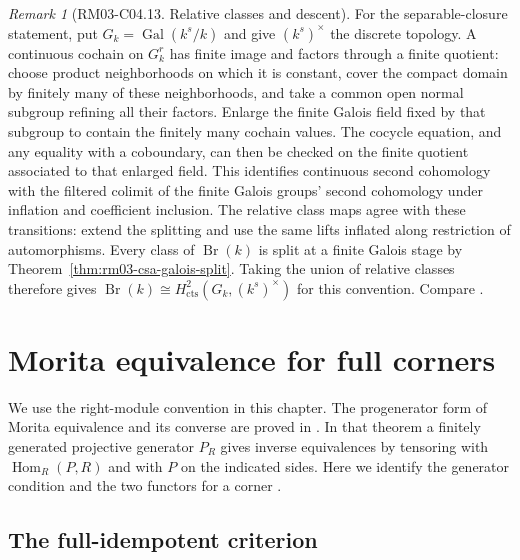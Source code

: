 \documentclass[11pt,oneside,openany]{book}
\theoremstyle{definition}
\theoremstyle{remark}
\newtheorem{remark}[theorem]{Remark}
\begin{document}
\begin{remark}[RM03-C04.13. Relative classes and descent]
For the separable-closure statement, put \(G_k=\operatorname{Gal}(k^s/k)\)
and give \((k^s)^\times\) the discrete topology. A continuous cochain
on \(G_k^r\) has finite image and factors through a finite quotient:
choose product neighborhoods on which it is constant, cover the
compact domain by finitely many of these neighborhoods, and take a
common open normal subgroup refining all their factors. Enlarge the
finite Galois field fixed by that subgroup to contain the finitely
many cochain values. The cocycle equation, and any equality with a
coboundary, can then be checked on the finite quotient associated to
that enlarged field. This identifies continuous second cohomology
with the filtered colimit of the finite Galois groups'
second cohomology under inflation and coefficient inclusion.
The relative class maps agree with these transitions: extend the
splitting and use the same lifts inflated along restriction of
automorphisms. Every class of \(\operatorname{Br}(k)\) is split
at a finite Galois stage by Theorem~\ref{thm:rm03-csa-galois-split}.
Taking the union of relative classes therefore gives
\(\operatorname{Br}(k)\cong H^2_{\mathrm{cts}}(G_k,(k^s)^\times)\)
for this convention. Compare \cite[Theorem~59.61.6]{stacksdescent}.
\end{remark}
\chapter{Morita equivalence for full corners}
\label{ch:rm03-morita}

We use the right-module convention in this chapter. The progenerator
form of Morita equivalence and its converse are proved in
\cite[Ch.~3, ALG-03-C02-S05]{p103}. In that theorem a finitely generated
projective generator \(P_R\) gives inverse equivalences by tensoring
with \(\operatorname{Hom}_R(P,R)\) and with \(P\) on the indicated
sides. Here we identify the generator condition and the two functors
for a corner
\cite[Lec.~7]{mitmorita}.

\section{The full-idempotent criterion}
\end{document}
